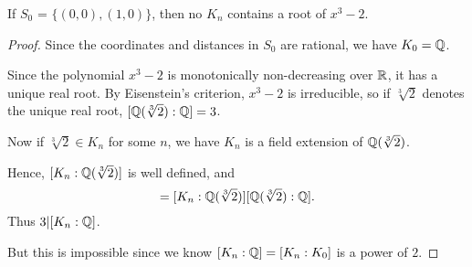 \documentclass{unswmaths}
\begin{document}
\begin{theorem}
    If $S_0$ = $\{(0,0),(1,0)\}$, then no $K_n$ contains a root of $x^3-2$.
\end{theorem}
\begin{proof}
    Since the coordinates and distances in $S_0$ are rational, we have $K_0 = \mathbb{Q}$. 

    Since the polynomial $x^3 - 2$ is monotonically non-decreasing over $\mathbb{R}$, it has a unique real root. By Eisenstein's criterion, 
    $x^3-2$ is irreducible, so if $\sqrt[3]{2}$ denotes the unique real root, $[\mathbb{Q}(\sqrt[3]{2}):\mathbb{Q}] = 3$.
    
    Now if $\sqrt[3]{2} \in K_n$ for some $n$, we have $K_n$ is a field extension of $\mathbb{Q}(\sqrt[3]{2})$. 
    
    Hence, $[K_n:\mathbb{Q}(\sqrt[3]{2})]$ is well defined, and
    \begin{equation*}
        [K_n:\Rat] = [K_n:\Rat(\sqrt[3]{2})][\Rat(\sqrt[3]{2}):\Rat].
    \end{equation*}
    Thus $3|[K_n:\mathbb{Q}]$.
    
    But this is impossible since we know $[K_n:\mathbb{Q}] = [K_n:K_0]$ is a power
    of $2$.  
    
    
\end{proof}
\end{document}
